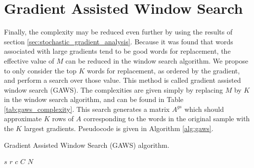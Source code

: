 \section{Gradient Assisted Window Search}
Finally, the complexity may be reduced even further by using the results of section \ref{sec:stochastic_gradient_analysis}.  Because it was found that words associated with large gradients tend to be good words for replacement, the effective value of $M$ can be reduced in the window search algorithm.  We propose to only consider the top $K$ words for replacement, as ordered by the gradient, and perform a search over those value. This method is called gradient assisted window search (GAWS).  The complexities are given simply by replacing $M$ by $K$ in the window search algorithm, and can be found in Table \ref{tab:gaws_complexity}.  This search generates a matrix $A^{gs}$ which should approximate $K$ rows of $A$ corresponding to the words in the original sample with the $K$ largest gradients.  Pseudocode is given in Algorithm \ref{alg:gaws}.
\begin{algorithm}
\begin{algorithmic}[1]
\begin{spacing}{1.0}
    \caption{Gradient Assisted Window Search (GAWS) algorithm.}
    \Require $s$ 
    \Require $r$ 
    \Require $c$ 
    \Require $C$ 
    \Require $N$ 
         
    \EndFor
     

         
                \EndIf
            \EndIf
        \EndFor
    \EndFor\\
\label{alg:gaws}
\end{spacing}
\end{algorithmic}
\end{algorithm}

